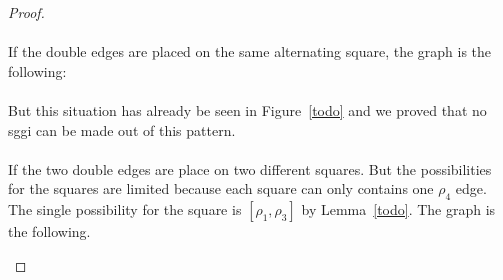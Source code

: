 \begin{proof}
\paragraph{}
If the double edges are placed on the same alternating square, the graph is the following:

\begin{figure}[H]
  \begin{center}
    \caption{}
  \end{center}
\end{figure}

\paragraph{}
But this situation has already be seen in Figure~\ref{todo} and we proved that no sggi can be made out of this pattern.

\paragraph{}
If the two double edges are place on two different squares. But the possibilities for the squares are limited because each square can only contains one $\rho_4$ edge. The single possibility for the square is $[\rho_1, \rho_3]$ by Lemma~\ref{todo}. The graph is the following.

\begin{figure}[H]
  \begin{center}
    \begin{tikzpicture}[scale=.8]


\end{tikzpicture}
\end{center}
\end{figure}
\end{proof}
